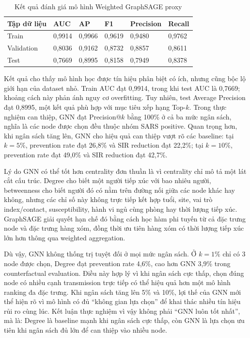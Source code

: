 \documentclass[12pt,a4paper]{report}
\theoremstyle{definition}
\begin{document}
\begin{table}[H]
\centering
\caption{Kết quả đánh giá mô hình Weighted GraphSAGE proxy}
\label{tab:gnn_proxy_results_ch3}
\begin{tabular}{L{3.0cm} C{2.0cm} C{2.0cm} C{2.0cm} C{2.0cm} C{2.0cm}}
\toprule
\textbf{Tập dữ liệu} & \textbf{AUC} & \textbf{AP} & \textbf{F1} & \textbf{Precision} & \textbf{Recall}\\
\midrule
Train & 0,9914 & 0,9966 & 0,9619 & 0,9480 & 0,9762\\
Validation & 0,8036 & 0,9162 & 0,8732 & 0,8857 & 0,8611\\
Test & 0,7669 & 0,8995 & 0,8158 & 0,7949 & 0,8378\\
\bottomrule
\end{tabular}
\end{table}

Kết quả cho thấy mô hình học được tín hiệu phân biệt có ích, nhưng cũng bộc lộ giới hạn của dataset nhỏ. Train AUC đạt 0,9914, trong khi test AUC là 0,7669; khoảng cách này phản ánh nguy cơ overfitting. Tuy nhiên, test Average Precision đạt 0,8995, một kết quả phù hợp với mục tiêu xếp hạng Top-$k$. Trong thực nghiệm can thiệp, GNN đạt Precision@$k$ bằng 100\% ở cả ba mức ngân sách, nghĩa là các node được chọn đều thuộc nhóm SARS positive. Quan trọng hơn, khi ngân sách tăng lên, GNN cho hiệu quả can thiệp vượt rõ các baseline: tại $k=5\%$, prevention rate đạt 26,8\% và SIR reduction đạt 22,2\%; tại $k=10\%$, prevention rate đạt 49,0\% và SIR reduction đạt 42,7\%.

Lý do GNN có thể tốt hơn centrality đơn thuần là vì centrality chỉ mô tả một lát cắt cấu trúc. Degree cho biết một người tiếp xúc với bao nhiêu người, betweenness cho biết người đó có nằm trên đường nối giữa các node khác hay không, nhưng các chỉ số này không trực tiếp kết hợp tuổi, site, vai trò index/contact, susceptibility, hành vi ngủ cùng phòng hay thời lượng tiếp xúc. GraphSAGE giải quyết hạn chế đó bằng cách học hàm phi tuyến từ cả đặc trưng node và đặc trưng hàng xóm, đồng thời ưu tiên hàng xóm có thời lượng tiếp xúc lớn hơn thông qua weighted aggregation.

Dù vậy, GNN không thống trị tuyệt đối ở mọi mức ngân sách. Ở $k=1\%$ chỉ có 3 node được chọn, Degree đạt prevention rate 4,6\%, cao hơn GNN 3,9\% trong counterfactual evaluation. Điều này hợp lý vì khi ngân sách cực thấp, chọn đúng node có nhiều cạnh transmission trực tiếp có thể hiệu quả hơn một mô hình ranking đa đặc trưng. Khi ngân sách tăng lên 5\% và 10\%, lợi thế của GNN mới thể hiện rõ vì mô hình có đủ ``không gian lựa chọn'' để khai thác nhiều tín hiệu rủi ro cùng lúc. Kết luận thực nghiệm vì vậy không phải ``GNN luôn tốt nhất'', mà là: Degree là baseline mạnh khi ngân sách cực thấp, còn GNN là lựa chọn ưu tiên khi ngân sách đủ lớn để can thiệp vào nhiều node.
\end{document}
